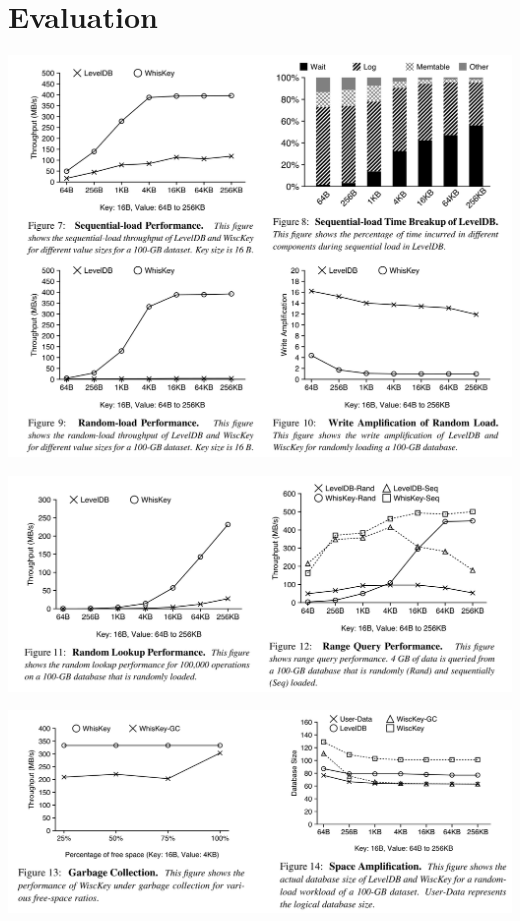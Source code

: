 \documentclass[11pt]{article}
\begin{document}
\section{Evaluation}
\label{sec:org94fdfad}
\begin{center}
\includegraphics[width=.99\textwidth]{../../images/db/18.png}
\label{}
\end{center}

\begin{center}
\includegraphics[width=.99\textwidth]{../../images/db/19.png}
\label{}
\end{center}

\begin{center}
\includegraphics[width=.99\textwidth]{../../images/db/20.png}
\label{}
\end{center}
\end{document}
